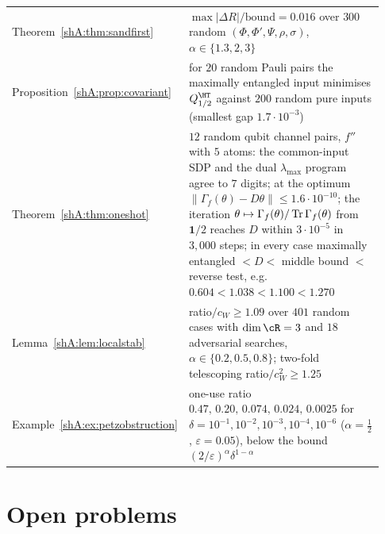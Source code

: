 {\begin{longtable}{>{\raggedright\arraybackslash}p{0.38\linewidth}>{\raggedright\arraybackslash}p{0.55\linewidth}}
Theorem~\ref{shA:thm:sandfirst} & $\max|\Delta R|/\text{bound}=0.016$ over $300$ random $(\Phi,\Phi',\Psi,\rho,\sigma)$, $\alpha\in\{1.3,2,3\}$\\
Proposition~\ref{shA:prop:covariant} & for $20$ random Pauli pairs the maximally entangled input minimises $Q^\HT_{1/2}$ against $200$ random pure inputs (smallest gap $1.7\cdot10^{-3}$)\\
Theorem~\ref{shA:thm:oneshot} & $12$ random qubit channel pairs, $f''$ with $5$ atoms: the common-input SDP and the dual $\lambda_{\max}$ program agree to $7$ digits; at the optimum $\|\Gamma_f(\theta)-D\theta\|\le1.6\cdot10^{-10}$; the iteration $\theta\mapsto\Gamma_f(\theta)/\operatorname{Tr}\Gamma_f(\theta)$ from $\mathbf 1/2$ reaches $D$ within $3\cdot10^{-5}$ in $3{,}000$ steps; in every case maximally entangled $<D<$ middle bound $<$ reverse test, e.g.\ $0.604<1.038<1.100<1.270$\\
Lemma~\ref{shA:lem:localstab} & ratio$/c_W\ge1.09$ over $401$ random cases with $\dim\cR=3$ and $18$ adversarial searches, $\alpha\in\{0.2,0.5,0.8\}$; two-fold telescoping ratio$/c_W^2\ge1.25$\\
Example~\ref{shA:ex:petzobstruction} & one-use ratio $0.47,\,0.20,\,0.074,\,0.024,\,0.0025$ for $\delta=10^{-1},10^{-2},10^{-3},10^{-4},10^{-6}$ ($\alpha=\frac12$, $\varepsilon=0.05$), below the bound $(2/\varepsilon)^\alpha\delta^{1-\alpha}$\\
\bottomrule
\end{longtable}
}

\section{Open problems}\label{shA:sec:open}

